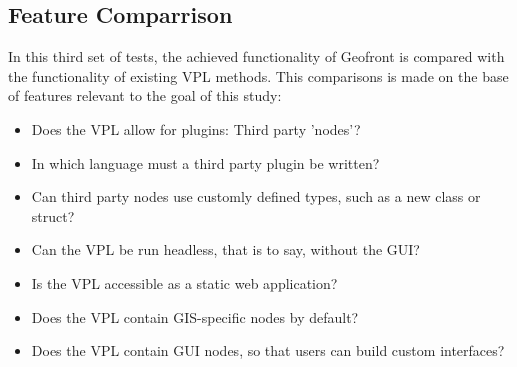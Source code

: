 




\subsection{Feature Comparrison}
\label{sec:method:tests:features}

In this third set of tests, the achieved functionality of Geofront is compared with the functionality of existing VPL methods. 
This comparisons is made on the base of features relevant to the goal of this study:
\begin{itemize}[-]
  \item Does the VPL allow for plugins: Third party 'nodes'?  
  \item In which language must a third party plugin be written?
  \item Can third party nodes use customly defined types, such as a new class or struct?
  \item Can the VPL be run headless, that is to say, without the \ac{GUI}?
  \item Is the VPL accessible as a static web application?
  \item Does the VPL contain GIS-specific nodes by default?
  \item Does the VPL contain \ac{GUI} nodes, so that users can build custom interfaces?
\end{itemize}

